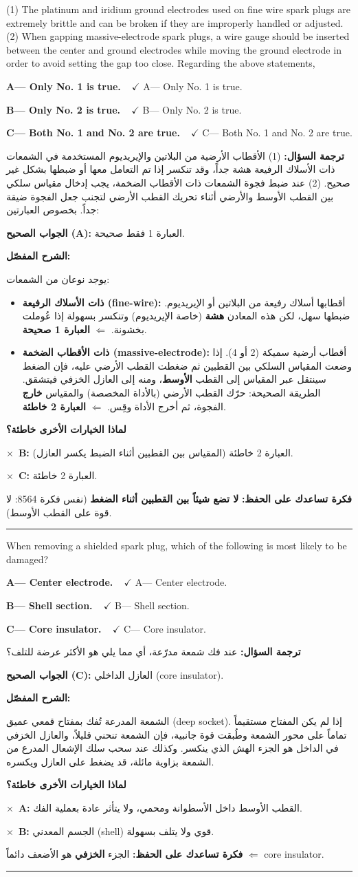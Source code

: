 \documentclass[11pt,a4paper]{article}
\newcommand{\en}[1]{\textenglish{#1}}
\newcommand{\correctletter}{}
\newcommand{\opt}[2]{%
  \ifdefstring{\correctletter}{#1}%
    {\textcolor{ansgreen}{\textbf{#1— #2\ \ $\checkmark$}}}%
    {#1— #2}\par}
\newcommand{\Q}[6]{%
  \renewcommand{\correctletter}{#6}%
  \par\bigskip
  \phantomsection\label{q#1}%
  \begin{tcolorbox}[enhanced,breakable,colback=qback,colframe=qframe,
      arc=2mm,boxrule=0.8pt,fonttitle=\bfseries,
      title={\en{Question #1}}]
    \begin{english}
      #2\par\smallskip
      \opt{A}{#3}\opt{B}{#4}\opt{C}{#5}
    \end{english}
  \end{tcolorbox}}
\newcommand{\tr}[1]{\textbf{\textcolor{qframe}{ترجمة السؤال:}} #1\par}
\newcommand{\ans}[2]{%
  \begin{tcolorbox}[colback=ansback,colframe=ansgreen,boxrule=0.6pt,arc=1.5mm,
      left=4pt,right=4pt,top=2pt,bottom=2pt]
    \textbf{\textcolor{ansgreen}{الجواب الصحيح (\en{#1}):}} #2
  \end{tcolorbox}}
\newcommand{\sharh}[1]{\textbf{\textcolor{conceptc}{الشرح المفصّل:}}\par #1\par}
\newcommand{\nohead}{\textbf{\textcolor{wrongc}{لماذا الخيارات الأخرى خاطئة؟}}\par}
\newcommand{\no}[2]{\hspace*{1em}\textcolor{wrongc}{$\times$}\ \textbf{\en{#1}:} #2\par}
\newcommand{\tip}[1]{%
  \begin{tcolorbox}[colback=tipback,colframe=tipframe,boxrule=0.5pt,arc=1.5mm,
      left=4pt,right=4pt,top=2pt,bottom=2pt]
    \textbf{فكرة تساعدك على الحفظ:} #1
  \end{tcolorbox}}
\newcommand{\qsep}{\par\medskip\noindent\textcolor{qframe!40}{\rule{\linewidth}{0.4pt}}\par}
\begin{document}
\Q{8576}{(1) The platinum and iridium ground electrodes used on fine wire spark plugs are extremely brittle and can be broken if they are improperly handled or adjusted. (2) When gapping massive-electrode spark plugs, a wire gauge should be inserted between the center and ground electrodes while moving the ground electrode in order to avoid setting the gap too close. Regarding the above statements,}
{Only No. 1 is true.}
{Only No. 2 is true.}
{Both No. 1 and No. 2 are true.}{A}
\tr{(1) الأقطاب الأرضية من البلاتين والإيريديوم المستخدمة في الشمعات ذات الأسلاك الرفيعة هشة جداً، وقد تنكسر إذا تم التعامل معها أو ضبطها بشكل غير صحيح. (2) عند ضبط فجوة الشمعات ذات الأقطاب الضخمة، يجب إدخال مقياس سلكي بين القطب الأوسط والأرضي أثناء تحريك القطب الأرضي لتجنب جعل الفجوة ضيقة جداً. بخصوص العبارتين:}
\ans{A}{العبارة 1 فقط صحيحة.}
\sharh{يوجد نوعان من الشمعات:
\begin{itemize}
  \item \textbf{ذات الأسلاك الرفيعة (\en{fine-wire}):} أقطابها أسلاك رفيعة من البلاتين أو الإيريديوم. ضبطها سهل، لكن هذه المعادن \textbf{هشة} (خاصة الإيريديوم) وتنكسر بسهولة إذا عُوملت بخشونة. $\Leftarrow$ \textbf{العبارة 1 صحيحة}.
  \item \textbf{ذات الأقطاب الضخمة (\en{massive-electrode}):} أقطاب أرضية سميكة (2 أو 4). إذا وضعت المقياس السلكي بين القطبين ثم ضغطت القطب الأرضي عليه، فإن الضغط سينتقل عبر المقياس إلى القطب \textbf{الأوسط}، ومنه إلى العازل الخزفي فيتشقق. الطريقة الصحيحة: حرّك القطب الأرضي (بالأداة المخصصة) والمقياس \textbf{خارج} الفجوة، ثم أخرج الأداة وقِس. $\Leftarrow$ \textbf{العبارة 2 خاطئة}.
\end{itemize}}
\nohead
\no{B}{العبارة 2 خاطئة (المقياس بين القطبين أثناء الضبط يكسر العازل).}
\no{C}{العبارة 2 خاطئة.}
\tip{\textbf{لا تضع شيئاً بين القطبين أثناء الضغط} (نفس فكرة 8564: لا قوة على القطب الأوسط).}
\qsep

\Q{8546}{When removing a shielded spark plug, which of the following is most likely to be damaged?}
{Center electrode.}
{Shell section.}
{Core insulator.}{C}
\tr{عند فك شمعة مدرّعة، أي مما يلي هو الأكثر عرضة للتلف؟}
\ans{C}{العازل الداخلي (\en{core insulator}).}
\sharh{الشمعة المدرعة تُفك بمفتاح قمعي عميق (\en{deep socket}). إذا لم يكن المفتاح مستقيماً تماماً على محور الشمعة وطُبقت قوة جانبية، فإن الشمعة تنحني قليلاً، والعازل الخزفي في الداخل هو الجزء الهش الذي ينكسر. وكذلك عند سحب سلك الإشعال المدرع من الشمعة بزاوية مائلة، قد يضغط على العازل ويكسره.}
\nohead
\no{A}{القطب الأوسط داخل الأسطوانة ومحمي، ولا يتأثر عادة بعملية الفك.}
\no{B}{الجسم المعدني (\en{shell}) قوي ولا يتلف بسهولة.}
\tip{الجزء \textbf{الخزفي} هو الأضعف دائماً $\Leftarrow$ \en{core insulator}.}
\qsep
\end{document}
